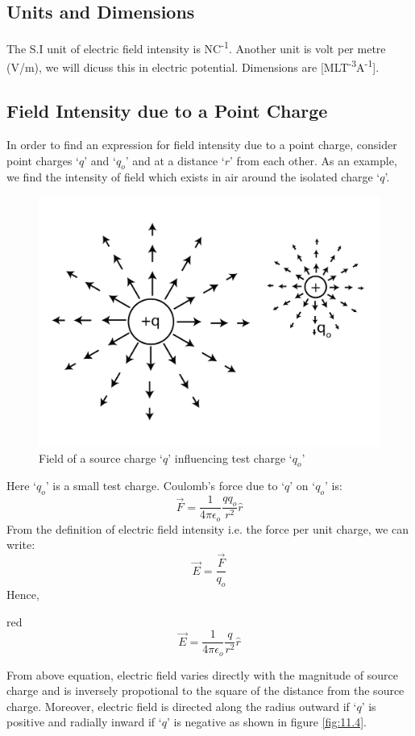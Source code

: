 \subsection*{Units and Dimensions}
The S.I unit of electric field intensity is NC\textsuperscript{-1}. Another unit is volt per metre (V/m),
we will dicuss this in electric potential. Dimensions are [MLT\textsuperscript{-3}A\textsuperscript{-1}].
\subsection{Field Intensity due to a Point Charge}
In order to find an expression for field intensity due to a point charge,
consider point charges `$q$' and `$q_{o}$' and at a distance `$r$' from each other.
As an example, we find the intensity of field
which exists in air around the isolated charge `$q$'.
\begin{figure}[H]
  \centering
  \includegraphics[scale = 0.9]{Images/Chapter-11/11.3.png}
  \caption{Field of a source charge  `$q$' influencing test charge `$q_{o}$'}
  \label{fig:11.3}
\end{figure}
\noindent Here `$q_{o}$' is a small test charge. Coulomb’s force due
to `$q$' on `$q_{o}$' is:
\begin{equation}\label{eq:11.14}
  \vec{F} = \frac{1}{4\pi\epsilon_{o}} \frac{qq_{o}}{r^{2}} \hat{r}
\end{equation}
From the definition of electric field intensity i.e. the force per unit charge,
we can write:
\begin{equation}
  \vec{E} = \frac{\vec{F}}{q_{o}} \nonumber
\end{equation}
Hence,
\begin{mybox}{red}{}
\begin{equation}\label{eq:11.15}
  \vec{E} = \frac{1}{4\pi\epsilon_{o}} \frac{q}{r^{2}} \hat{r}
\end{equation}
\end{mybox}
From above equation, electric field varies directly with the magnitude
of source charge and is inversely propotional to the square of the
distance from the source charge. Moreover, electric field is
directed along the radius outward if `$q$' is 
positive and radially inward if `$q$' is negative as shown in figure \ref{fig:11.4}.


